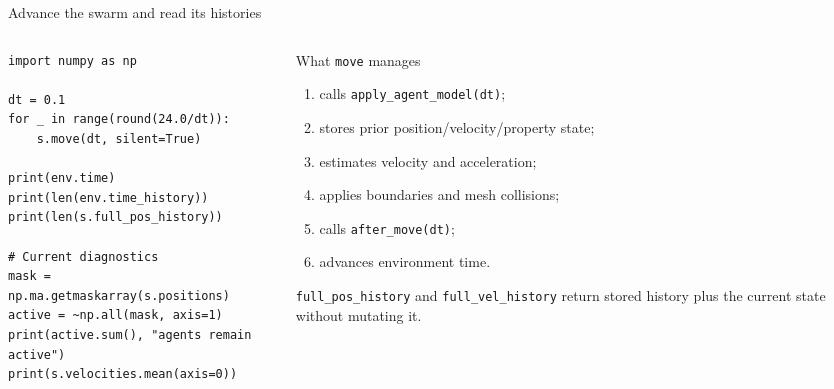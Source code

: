 \documentclass[aspectratio=169,11pt]{beamer}
\begin{document}
\begin{frame}[fragile]{Advance the swarm and read its histories}
\small
\begin{columns}[T,onlytextwidth]
\begin{column}{0.58\textwidth}
\begin{lstlisting}
import numpy as np

dt = 0.1
for _ in range(round(24.0/dt)):
    s.move(dt, silent=True)

print(env.time)
print(len(env.time_history))
print(len(s.full_pos_history))

# Current diagnostics
mask = np.ma.getmaskarray(s.positions)
active = ~np.all(mask, axis=1)
print(active.sum(), "agents remain active")
print(s.velocities.mean(axis=0))
\end{lstlisting}
\end{column}
\begin{column}{0.38\textwidth}
\begin{block}{What \texttt{move} manages}
\begin{enumerate}\itemsep2pt
  \item calls \texttt{apply\_agent\_model(dt)};
  \item stores prior position/velocity/property state;
  \item estimates velocity and acceleration;
  \item applies boundaries and mesh collisions;
  \item calls \texttt{after\_move(dt)};
  \item advances environment time.
\end{enumerate}
\end{block}
{\scriptsize{} \texttt{full\_pos\_history} and \texttt{full\_vel\_history} return stored history plus the current state without mutating it.}
\end{column}
\end{columns}
\end{frame}
\end{document}
